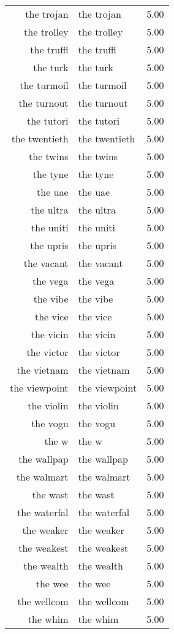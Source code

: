 \begin{table}[ht]
\begin{tabular}{rlr}
  the trojan & the trojan & 5.00 \\ 
  the trolley & the trolley & 5.00 \\ 
  the truffl & the truffl & 5.00 \\ 
  the turk & the turk & 5.00 \\ 
  the turmoil & the turmoil & 5.00 \\ 
  the turnout & the turnout & 5.00 \\ 
  the tutori & the tutori & 5.00 \\ 
  the twentieth & the twentieth & 5.00 \\ 
  the twins & the twins & 5.00 \\ 
  the tyne & the tyne & 5.00 \\ 
  the uae & the uae & 5.00 \\ 
  the ultra & the ultra & 5.00 \\ 
  the uniti & the uniti & 5.00 \\ 
  the upris & the upris & 5.00 \\ 
  the vacant & the vacant & 5.00 \\ 
  the vega & the vega & 5.00 \\ 
  the vibe & the vibe & 5.00 \\ 
  the vice & the vice & 5.00 \\ 
  the vicin & the vicin & 5.00 \\ 
  the victor & the victor & 5.00 \\ 
  the vietnam & the vietnam & 5.00 \\ 
  the viewpoint & the viewpoint & 5.00 \\ 
  the violin & the violin & 5.00 \\ 
  the vogu & the vogu & 5.00 \\ 
  the w & the w & 5.00 \\ 
  the wallpap & the wallpap & 5.00 \\ 
  the walmart & the walmart & 5.00 \\ 
  the wast & the wast & 5.00 \\ 
  the waterfal & the waterfal & 5.00 \\ 
  the weaker & the weaker & 5.00 \\ 
  the weakest & the weakest & 5.00 \\ 
  the wealth & the wealth & 5.00 \\ 
  the wee & the wee & 5.00 \\ 
  the wellcom & the wellcom & 5.00 \\ 
  the whim & the whim & 5.00 \\ 

\end{tabular}
\end{table}
